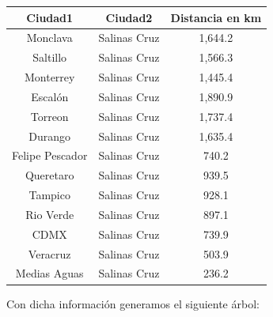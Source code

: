 \documentclass[14pt,letterpaper]{article}
\begin{document}
\begin{enumerate}
\begin{enumerate}
      \begin{table}[h]
        \centering
        \begin{tabular}{|c|c|c|}
          \hline
              {\bf Ciudad1} & {\bf Ciudad2} & {\bf Distancia en km}\\\hline
              Monclava & Salinas Cruz & 1,644.2\\\hline
              Saltillo &  Salinas Cruz & 1,566.3\\\hline
              Monterrey & Salinas Cruz & 1,445.4\\\hline
              Escalón & Salinas Cruz & 1,890.9\\\hline
              Torreon & Salinas Cruz & 1,737.4\\\hline
              Durango & Salinas Cruz & 1,635.4\\\hline
              Felipe Pescador & Salinas Cruz & 740.2\\\hline
              Queretaro & Salinas Cruz &  939.5\\\hline
              Tampico & Salinas Cruz & 928.1\\\hline
              Rio Verde & Salinas Cruz & 897.1\\\hline
              CDMX & Salinas Cruz & 739.9\\\hline
              Veracruz & Salinas Cruz & 503.9 \\\hline
              Medias Aguas & Salinas Cruz & 236.2\\\hline
        \end{tabular}
      \end{table}

      Con dicha información generamos el siguiente árbol:
     

\end{enumerate}
\end{enumerate}
\end{document}
